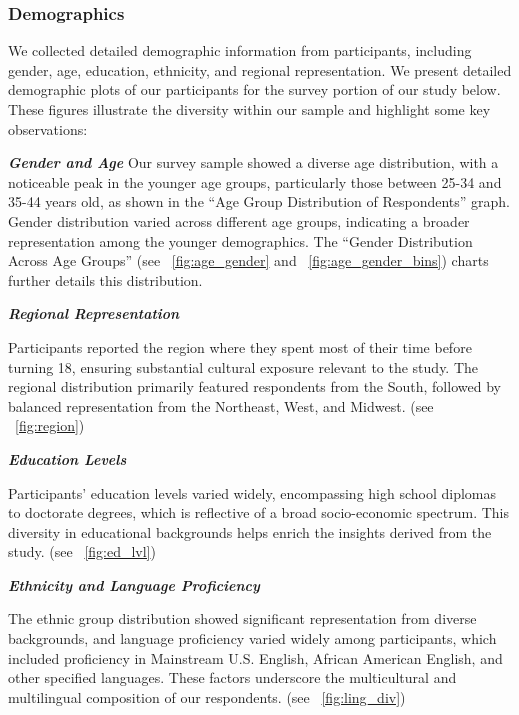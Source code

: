 \subsubsection{Demographics}
We collected detailed demographic information from participants, including gender, age, education, ethnicity, and regional representation. We present detailed demographic plots of our participants for the survey portion of our study below.
These figures illustrate the diversity within our sample and highlight some key observations:


\textbf{\textit{Gender and Age}} Our survey sample showed a diverse age distribution, with a noticeable peak in the younger age groups, particularly those between 25-34 and 35-44 years old, as shown in the ``Age Group Distribution of Respondents'' graph. Gender distribution varied across different age groups, indicating a broader representation among the younger demographics. The ``Gender Distribution Across Age Groups'' (see ~\autoref{fig:age_gender} and ~\autoref{fig:age_gender_bins}) charts further details this distribution.

\textbf{\textit{Regional Representation}}

Participants reported the region where they spent most of their time before turning 18, ensuring substantial cultural exposure relevant to the study. The regional distribution primarily featured respondents from the South, followed by balanced representation from the Northeast, West, and Midwest. (see ~\autoref{fig:region})

\textbf{\textit{Education Levels}}

Participants’ education levels varied widely, encompassing high school diplomas to doctorate degrees, which is reflective of a broad socio-economic spectrum. This diversity in educational backgrounds helps enrich the insights derived from the study. (see ~\autoref{fig:ed_lvl})

\textbf{\textit{Ethnicity and Language Proficiency}}

The ethnic group distribution showed significant representation from diverse backgrounds, and language proficiency varied widely among participants, which included proficiency in Mainstream U.S. English, African American English, and other specified languages. These factors underscore the multicultural and multilingual composition of our respondents. (see ~\autoref{fig:ling_div})

